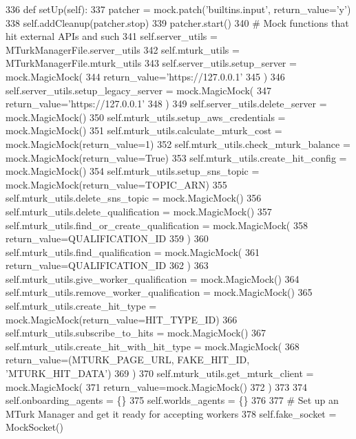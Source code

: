 \begin{DoxyCode}
336     \textcolor{keyword}{def }setUp(self):
337         patcher = mock.patch(\textcolor{stringliteral}{'builtins.input'}, return\_value=\textcolor{stringliteral}{'y'})
338         self.addCleanup(patcher.stop)
339         patcher.start()
340         \textcolor{comment}{# Mock functions that hit external APIs and such}
341         self.server\_utils = MTurkManagerFile.server\_utils
342         self.mturk\_utils = MTurkManagerFile.mturk\_utils
343         self.server\_utils.setup\_server = mock.MagicMock(
344             return\_value=\textcolor{stringliteral}{'https://127.0.0.1'}
345         )
346         self.server\_utils.setup\_legacy\_server = mock.MagicMock(
347             return\_value=\textcolor{stringliteral}{'https://127.0.0.1'}
348         )
349         self.server\_utils.delete\_server = mock.MagicMock()
350         self.mturk\_utils.setup\_aws\_credentials = mock.MagicMock()
351         self.mturk\_utils.calculate\_mturk\_cost = mock.MagicMock(return\_value=1)
352         self.mturk\_utils.check\_mturk\_balance = mock.MagicMock(return\_value=\textcolor{keyword}{True})
353         self.mturk\_utils.create\_hit\_config = mock.MagicMock()
354         self.mturk\_utils.setup\_sns\_topic = mock.MagicMock(return\_value=TOPIC\_ARN)
355         self.mturk\_utils.delete\_sns\_topic = mock.MagicMock()
356         self.mturk\_utils.delete\_qualification = mock.MagicMock()
357         self.mturk\_utils.find\_or\_create\_qualification = mock.MagicMock(
358             return\_value=QUALIFICATION\_ID
359         )
360         self.mturk\_utils.find\_qualification = mock.MagicMock(
361             return\_value=QUALIFICATION\_ID
362         )
363         self.mturk\_utils.give\_worker\_qualification = mock.MagicMock()
364         self.mturk\_utils.remove\_worker\_qualification = mock.MagicMock()
365         self.mturk\_utils.create\_hit\_type = mock.MagicMock(return\_value=HIT\_TYPE\_ID)
366         self.mturk\_utils.subscribe\_to\_hits = mock.MagicMock()
367         self.mturk\_utils.create\_hit\_with\_hit\_type = mock.MagicMock(
368             return\_value=(MTURK\_PAGE\_URL, FAKE\_HIT\_ID, \textcolor{stringliteral}{'MTURK\_HIT\_DATA'})
369         )
370         self.mturk\_utils.get\_mturk\_client = mock.MagicMock(
371             return\_value=mock.MagicMock()
372         )
373 
374         self.onboarding\_agents = \{\}
375         self.worlds\_agents = \{\}
376 
377         \textcolor{comment}{# Set up an MTurk Manager and get it ready for accepting workers}
378         self.fake\_socket = MockSocket()

\end{DoxyCode}
